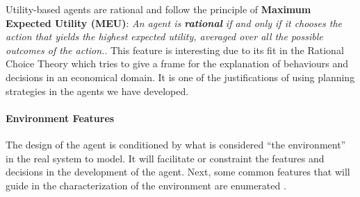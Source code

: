 \documentclass[11pt,oneside,a4paper,openright]{report}
\begin{document}
\begin{description}
\begin{description}
		Utility-based agents are rational and follow the principle of \textbf{Maximum Expected Utility (MEU)}: 
		\textit{An agent is \textbf{rational} if and only if it chooses the action that yields the highest
		expected utility, averaged over all the possible outcomes of the action.}\cite{RussellNorvig}.
		This feature is interesting due to its fit in the Rational Choice Theory \cite{rationalchoicetheo} which tries to give a frame for the explanation of behaviours and decisions in an economical domain.
		It is one of the justifications of using planning strategies in the agents we have developed.

	\end{description}


		
\end{description}






\paragraph{Environment Features}

The design of the agent is conditioned by what is considered ``the environment'' in the real system to model.
It will facilitate or constraint the features and decisions in the development of the agent. Next, some common features that will guide in the characterization of the environment are enumerated \cite[section 2.3]{RussellNorvig}.
\end{document}
